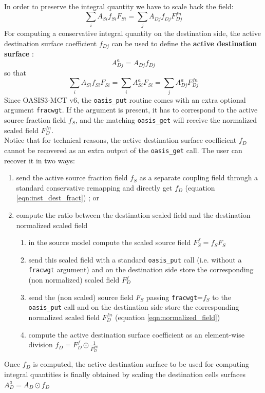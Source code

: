 In order to preserve the integral quantity we have to scale back the field:
\[\sum_iA_{Si}f_{Si}F_{Si} = \sum_jA_{Dj}f_{Dj}F^{fn}_{Dj}\]
For computing a conservative integral quantity on the destination side, the active destination surface coefficient \(f_{Dj}\) can be used to define the {\bf active destination surface} :
\begin{equation}\label{eqn:active_dest_area}
A^a_{Dj} = A_{Dj}f_{Dj}    
\end{equation}
so that
\[\sum_iA_{Si}f_{Si}F_{Si} = \sum_iA^a_{Si}F_{Si} =\sum_jA^a_{Dj}F^{fn}_{Dj}\]
Since OASIS3-MCT v6, the {\tt oasis\_put} routine comes with an extra optional argument {\tt fracwgt}. If  the argument is present, it has to correspond to the active source fraction field \(f_S\), and the matching {\tt oasis\_get} will receive the normalized scaled field \(F^{fn}_D\). \\
Notice that for technical reasons, the active destination surface coefficient \(f_D\) cannot be recovered as an extra output of the {\tt oasis\_get} call. The user can recover it in two ways:
\begin{enumerate}
    \item send the active source fraction field \(f_S\) as a separate coupling field through a standard conservative remapping and directly get \(f_D\) (equation \ref{eqn:inst_dest_fract}) ; or
    \item compute the ratio between the destination scaled field and the destination normalized scaled field  
    \begin{enumerate}
    \item in the source model compute the scaled source field \(F^f_S = f_SF_S\)
    \item send this scaled field with a standard {\tt oasis\_put} call (i.e. without a {\tt fracwgt} argument) and on the destination side store the corresponding (non normalized) scaled field \(F^f_D\)
    \item send the (non scaled) source field \(F_S\) passing {\tt fracwgt}=\(f_S\) to the  {\tt oasis\_put} call and on the destination side store the corresponding normalized scaled field \(F^{fn}_D\) (equation \ref{eqn:normalized_field})
    \item compute the active destination surface coefficient as an element-wise division \(f_D = F^f_D \odot \frac{1}{F^{fn}_D}\)
    \end{enumerate}
\end{enumerate}
Once \(f_D\) is computed, the active destination surface to be used for computing integral quantities is finally obtained by scaling the destination cells surfaces \(A^a_D = A_D \odot f_D\)

